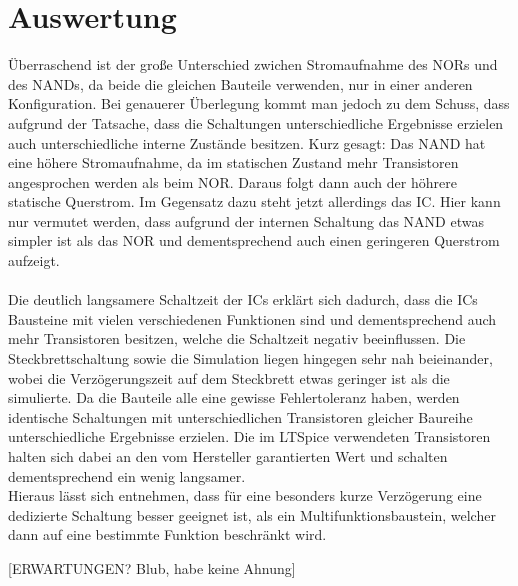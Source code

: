 \documentclass[11pt, a4paper]{article}
\begin{document}
\section*{Auswertung}
Überraschend ist der große Unterschied zwichen Stromaufnahme des NORs und des NANDs, da beide die gleichen Bauteile verwenden, nur in einer anderen Konfiguration. Bei genauerer Überlegung kommt man jedoch zu dem Schuss, dass aufgrund der Tatsache, dass die Schaltungen unterschiedliche Ergebnisse erzielen auch unterschiedliche interne Zustände besitzen. Kurz gesagt: Das NAND hat eine höhere Stromaufnahme, da im statischen Zustand mehr Transistoren angesprochen werden als beim NOR. Daraus folgt dann auch der höhrere statische Querstrom. Im Gegensatz dazu steht jetzt allerdings das IC. Hier kann nur vermutet werden, dass aufgrund der internen Schaltung das NAND etwas simpler ist als das NOR und dementsprechend auch einen geringeren Querstrom aufzeigt.
\\
\\
Die deutlich langsamere Schaltzeit der ICs erklärt sich dadurch, dass die ICs Bausteine mit vielen verschiedenen Funktionen sind und dementsprechend auch mehr Transistoren besitzen, welche die Schaltzeit negativ beeinflussen.
Die Steckbrettschaltung sowie die Simulation liegen hingegen sehr nah beieinander, wobei die Verzögerungszeit auf dem Steckbrett etwas geringer ist als die simulierte. Da die Bauteile alle eine gewisse Fehlertoleranz haben, werden identische Schaltungen mit unterschiedlichen Transistoren gleicher Baureihe unterschiedliche Ergebnisse erzielen. Die im LTSpice verwendeten Transistoren halten sich dabei an den vom Hersteller garantierten Wert und schalten dementsprechend ein wenig langsamer.
\\
Hieraus lässt sich entnehmen, dass für eine besonders kurze Verzögerung eine dedizierte Schaltung besser geeignet ist, als ein Multifunktionsbaustein, welcher dann auf eine bestimmte Funktion beschränkt wird.


[ERWARTUNGEN? Blub, habe keine Ahnung]
\end{document}
